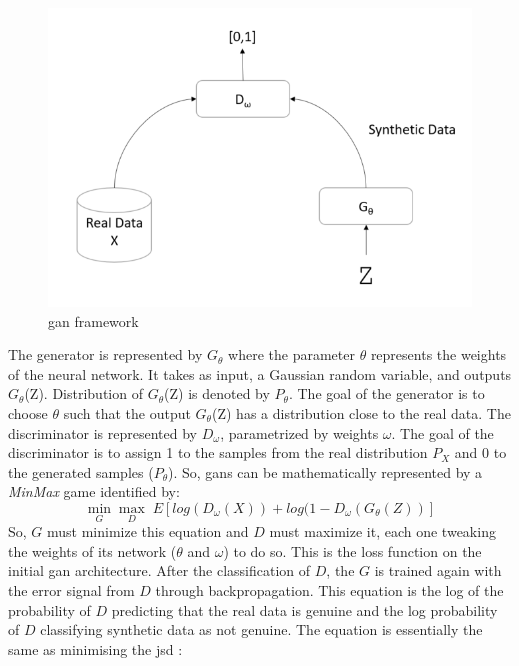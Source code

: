 \begin{figure}
\centering
\includegraphics[scale=0.75]{figures/image.png}

\caption{\ac{gan} framework} \label{fig:gan-arch}
\end{figure}
The generator is represented by $G_{\theta}$ where the parameter $\theta$ represents the weights of
the neural network. It takes as input, a Gaussian random variable, and outputs $G_{\theta}$(Z).
Distribution of $G_{\theta}$(Z) is denoted by $P_{\theta}$. The goal of the generator is to choose $\theta$ such that the output $G_{\theta}$(Z) has a distribution close to the real data. The discriminator is represented by $D_{\omega}$, parametrized by weights $\omega$. The goal of the discriminator is to assign 1 to the samples from the real distribution $P_{X}$ and 0 to the generated samples ($P_{\theta}$). So, \acp{gan} can be mathematically represented by a \textit{MinMax} game identified by:
\begin{equation}
\min_{G}\max_{D} \; E [log(D_{\omega}(X)) + log(1-D_{\omega}(G_{\theta}(Z))]
\end{equation}
So, $G$ must minimize this equation and $D$ must maximize it, each one tweaking the weights of its network ($\theta$ and $\omega$) to do so. This is the loss function on the initial \ac{gan} architecture. After the classification of $D$, the $G$ is trained again with the error signal from $D$ through backpropagation. This equation is the log of the probability of $D$ predicting that the real data is genuine and the log probability of $D$ classifying synthetic data as not genuine. The equation is essentially the same as minimising the \ac{jsd} \cite{goodfellow_generative_2014}:
